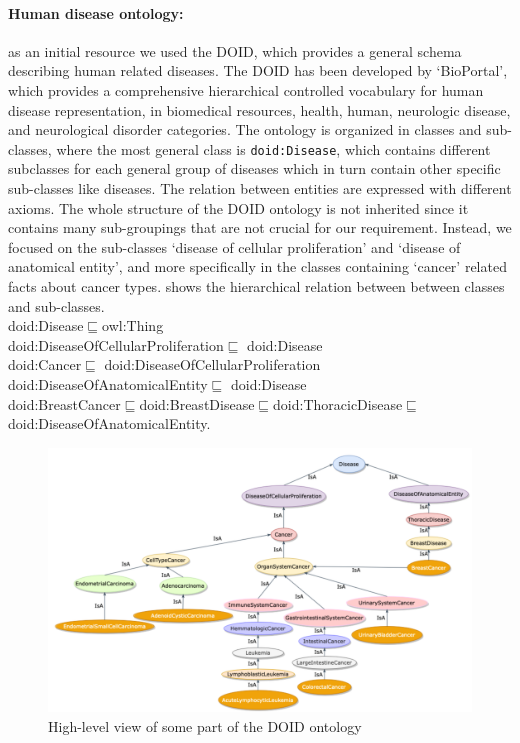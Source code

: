 \paragraph{Human disease ontology:} \hspace*{-2.5mm} as an initial resource we used the DOID, which provides a general schema describing human related diseases. The DOID has been developed by `BioPortal', which provides a comprehensive hierarchical controlled vocabulary for human disease representation, in biomedical resources, health, human, neurologic disease, and neurological disorder categories. The ontology is organized in classes and sub-classes, where the most general class is \texttt{doid:Disease}, which contains different subclasses for each general group of diseases which in turn contain other specific sub-classes like diseases. The relation between entities are expressed with different axioms. 
\hspace*{3.5mm} The whole structure of the DOID ontology is not inherited since it contains many sub-groupings that are not crucial for our requirement. Instead, we focused on the sub-classes `disease of cellular proliferation' and `disease of anatomical entity', and more specifically in the classes containing `cancer' related facts about cancer types.  shows the hierarchical relation between between classes and sub-classes. \\ 

\vspace{-4mm}
{\scriptsize \noindent doid:Disease$\sqsubseteq$owl:Thing \\
doid:DiseaseOfCellularProliferation$\sqsubseteq$ doid:Disease\\
doid:Cancer$\sqsubseteq$ doid:DiseaseOfCellularProliferation\\
doid:DiseaseOfAnatomicalEntity$\sqsubseteq$ doid:Disease\\ 
doid:BreastCancer$\sqsubseteq$doid:BreastDisease$\sqsubseteq$doid:ThoracicDisease$  \sqsubseteq$doid:DiseaseOfAnatomicalEntity.} \\

\vspace{-4mm}

\begin{figure}
	\centering
	\includegraphics[width=0.75\linewidth,height=70mm]{images/do.png}
	\caption{High-level view of some part of the DOID ontology} 
	\label{fig:oncoontology14}
	\vspace{-2mm}
\end{figure}

